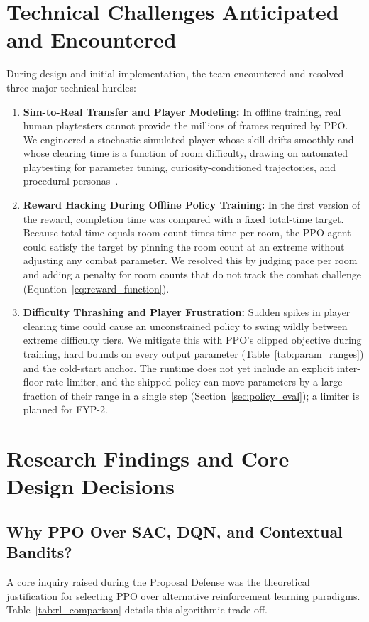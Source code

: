 \section{Technical Challenges Anticipated and Encountered}
During design and initial implementation, the team encountered and resolved three major technical hurdles:
\begin{enumerate}
    \item \textbf{Sim-to-Real Transfer and Player Modeling:} In offline training, real human playtesters cannot provide the millions of frames required by PPO. We engineered a stochastic simulated player whose skill drifts smoothly and whose clearing time is a function of room difficulty, drawing on automated playtesting for parameter tuning, curiosity-conditioned trajectories, and procedural personas~\cite{holmgard2019procedural, zook2014playtesting, sestini2024automated}.
    \item \textbf{Reward Hacking During Offline Policy Training:} In the first version of the reward, completion time was compared with a fixed total-time target. Because total time equals room count times time per room, the PPO agent could satisfy the target by pinning the room count at an extreme without adjusting any combat parameter. We resolved this by judging pace per room and adding a penalty for room counts that do not track the combat challenge (Equation~\ref{eq:reward_function}).
    \item \textbf{Difficulty Thrashing and Player Frustration:} Sudden spikes in player clearing time could cause an unconstrained policy to swing wildly between extreme difficulty tiers. We mitigate this with PPO's clipped objective during training, hard bounds on every output parameter (Table~\ref{tab:param_ranges}) and the cold-start anchor. The runtime does not yet include an explicit inter-floor rate limiter, and the shipped policy can move parameters by a large fraction of their range in a single step (Section~\ref{sec:policy_eval}); a limiter is planned for FYP-2.
\end{enumerate}

\section{Research Findings and Core Design Decisions}

\subsection{Why PPO Over SAC, DQN, and Contextual Bandits?}
A core inquiry raised during the Proposal Defense was the theoretical justification for selecting PPO over alternative reinforcement learning paradigms. Table~\ref{tab:rl_comparison} details this algorithmic trade-off.

